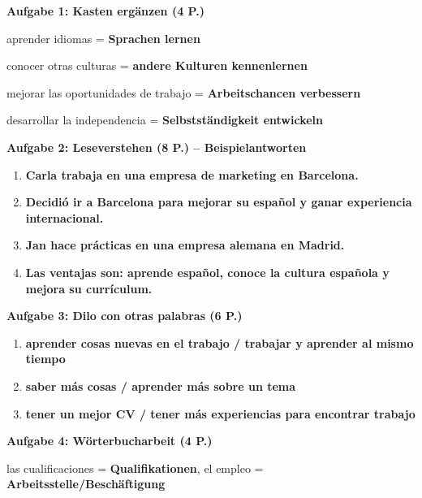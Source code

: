 \documentclass[11pt,a4paper]{article}
\newcommand{\lsg}[1]{\textcolor{loesung}{\textbf{#1}}}
\begin{document}
\begin{gruppeBbox}

\textbf{Aufgabe 1: Kasten ergänzen (4 P.)}

aprender idiomas = \lsg{Sprachen lernen}

conocer otras culturas = \lsg{andere Kulturen kennenlernen}

mejorar las oportunidades de trabajo = \lsg{Arbeitschancen verbessern}

desarrollar la independencia = \lsg{Selbstständigkeit entwickeln}

\vspace{0.5em}

\textbf{Aufgabe 2: Leseverstehen (8 P.) -- Beispielantworten}
\begin{enumerate}[label=\alph*), leftmargin=2em, nosep]
    \item \lsg{Carla trabaja en una empresa de marketing en Barcelona.}
    \item \lsg{Decidió ir a Barcelona para mejorar su español y ganar experiencia internacional.}
    \item \lsg{Jan hace prácticas en una empresa alemana en Madrid.}
    \item \lsg{Las ventajas son: aprende español, conoce la cultura española y mejora su currículum.}
\end{enumerate}

\vspace{0.5em}

\textbf{Aufgabe 3: Dilo con otras palabras (6 P.)}
\begin{enumerate}[label=\alph*), leftmargin=2em, nosep]
    \item \lsg{aprender cosas nuevas en el trabajo / trabajar y aprender al mismo tiempo}
    \item \lsg{saber más cosas / aprender más sobre un tema}
    \item \lsg{tener un mejor CV / tener más experiencias para encontrar trabajo}
\end{enumerate}

\vspace{0.5em}

\textbf{Aufgabe 4: Wörterbucharbeit (4 P.)}

las cualificaciones = \lsg{Qualifikationen}, el empleo = \lsg{Arbeitsstelle/Beschäftigung}


\end{gruppeBbox}
\end{document}
